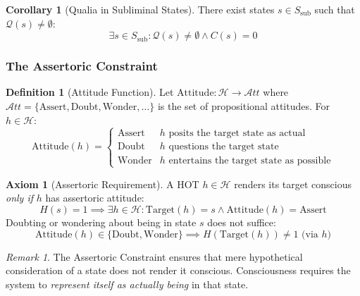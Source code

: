 \documentclass[11pt,a4paper]{article}
\theoremstyle{definition}
\newtheorem{definition}{Definition}[section]
\newtheorem{axiom}{Axiom}[section]
\newtheorem{corollary}{Corollary}[section]
\theoremstyle{remark}
\newtheorem*{remark}{Remark}
\newcommand{\Q}{\mathcal{Q}}
\newcommand{\Hset}{\mathcal{H}}
\newcommand{\Ssub}{S_{\text{sub}}}
\newcommand{\Target}{\text{Target}}
\newcommand{\Attitude}{\text{Attitude}}
\begin{document}
\begin{corollary}[Qualia in Subliminal States]
\label{cor:qualia-sub}
There exist states $s \in \Ssub$ such that $\Q(s) \neq \emptyset$:
\begin{equation}
\exists s \in \Ssub : \Q(s) \neq \emptyset \land C(s) = 0
\end{equation}
\end{corollary}

\subsubsection{The Assertoric Constraint}

\begin{definition}[Attitude Function]
\label{def:attitude}
Let $\Attitude: \Hset \to \mathcal{A}tt$ where $\mathcal{A}tt = \{\text{Assert}, \text{Doubt}, \text{Wonder}, \ldots\}$ is the set of propositional attitudes. For $h \in \Hset$:
\begin{equation}
\Attitude(h) =
\begin{cases}
\text{Assert} & h \text{ posits the target state as actual} \\
\text{Doubt} & h \text{ questions the target state} \\
\text{Wonder} & h \text{ entertains the target state as possible}
\end{cases}
\end{equation}
\end{definition}

\begin{axiom}[Assertoric Requirement]
\label{ax:assertoric}
A HOT $h \in \Hset$ renders its target conscious \textit{only if} $h$ has assertoric attitude:
\begin{equation}
\boxed{H(s) = 1 \implies \exists h \in \Hset : \Target(h) = s \land \Attitude(h) = \text{Assert}}
\end{equation}
Doubting or wondering about being in state $s$ does not suffice:
\begin{equation}
\Attitude(h) \in \{\text{Doubt}, \text{Wonder}\} \implies H(\Target(h)) \neq 1 \text{ (via } h \text{)}
\end{equation}
\end{axiom}

\begin{remark}
The Assertoric Constraint ensures that mere hypothetical consideration of a state does not render it conscious. Consciousness requires the system to \textit{represent itself as actually being} in that state.
\end{remark}
\end{document}
